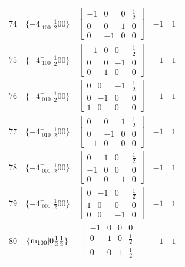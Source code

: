 \documentclass[fleqn,8pt]{jsarticle}
\begin{document}
\begin{longtable}{ccccc}
$ 74 $ & $ \{-4^{+}_{\,\,100}|\frac{1}{2} 0 0\} $ & $ \begin{bmatrix} -1 & 0 & 0 & \frac{1}{2} \\ 0 & 0 & 1 & 0 \\ 0 & -1 & 0 & 0 \end{bmatrix} $ & $ -1 $ & $ 1 $ \\ \hline
$ 75 $ & $ \{-4^{-}_{\,\,100}|\frac{1}{2} 0 0\} $ & $ \begin{bmatrix} -1 & 0 & 0 & \frac{1}{2} \\ 0 & 0 & -1 & 0 \\ 0 & 1 & 0 & 0 \end{bmatrix} $ & $ -1 $ & $ 1 $ \\ \hline
$ 76 $ & $ \{-4^{+}_{\,\,010}|\frac{1}{2} 0 0\} $ & $ \begin{bmatrix} 0 & 0 & -1 & \frac{1}{2} \\ 0 & -1 & 0 & 0 \\ 1 & 0 & 0 & 0 \end{bmatrix} $ & $ -1 $ & $ 1 $ \\ \hline
$ 77 $ & $ \{-4^{-}_{\,\,010}|\frac{1}{2} 0 0\} $ & $ \begin{bmatrix} 0 & 0 & 1 & \frac{1}{2} \\ 0 & -1 & 0 & 0 \\ -1 & 0 & 0 & 0 \end{bmatrix} $ & $ -1 $ & $ 1 $ \\ \hline
$ 78 $ & $ \{-4^{+}_{\,\,001}|\frac{1}{2} 0 0\} $ & $ \begin{bmatrix} 0 & 1 & 0 & \frac{1}{2} \\ -1 & 0 & 0 & 0 \\ 0 & 0 & -1 & 0 \end{bmatrix} $ & $ -1 $ & $ 1 $ \\ \hline
$ 79 $ & $ \{-4^{-}_{\,\,001}|\frac{1}{2} 0 0\} $ & $ \begin{bmatrix} 0 & -1 & 0 & \frac{1}{2} \\ 1 & 0 & 0 & 0 \\ 0 & 0 & -1 & 0 \end{bmatrix} $ & $ -1 $ & $ 1 $ \\ \hline
$ 80 $ & $ \{{\rm m}_{100}|0 \frac{1}{2} \frac{1}{2}\} $ & $ \begin{bmatrix} -1 & 0 & 0 & 0 \\ 0 & 1 & 0 & \frac{1}{2} \\ 0 & 0 & 1 & \frac{1}{2} \end{bmatrix} $ & $ -1 $ & $ 1 $ \\ \hline

\end{longtable}
\end{document}
